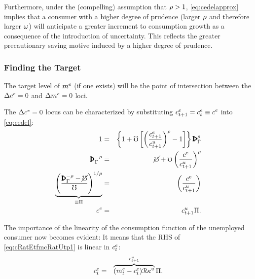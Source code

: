 \message{ !name(TractableBufferStock.tex)}\documentclass{handout}
\begin{document}
Furthermore, under the (compelling) assumption that $\rho > 1$, \eqref{eq:cedelapprox} implies that a consumer with
a higher degree of prudence (larger $\rho$ and therefore larger $\omega$) will
anticipate a greater increment to consumption growth as a consequence of the introduction of uncertainty.  This reflects the greater precautionary
saving motive induced by a higher degree of prudence.



\subsubsection{Finding the Target}

The target level of $m^{e}$ (if one exists) will be the point of intersection between the $\Delta c^{e}=0$ and $\Delta m^{e}=0$ loci.  

The $\Delta c^{e}=0$ locus can be characterized by substituting $c^{e}_{t+1}=c^{e}_{t} \equiv c^{e}$ into \eqref{eq:cedel}:
\begin{eqnarray}
         1 & = & \left\{1+\urate\left[\left(\frac{\cRatE_{t+1}}{\cRat_{t+1}^{u}}\right)^{\CRRA}-1\right]\right\} \PatPGro^{\CRRA} \label{eq:ctp1OctEq1}
\\ \PatPGro^{-\CRRA} & = &  \erate+\urate\left(\frac{\cRatE_{\tSS}}{\cRat_{t+1}^{u} }\right)^{\CRRA}
\\ \underbrace{\left(\frac{\PatPGro^{-\CRRA}-\erate}{\urate}\right)^{1/\CRRA}}_{\equiv \straight} & = &   \left(\frac{\cRatE_{\tSS}}{\cRatU_{t+1}}\right) \label{eq:straightDef}
\\      \cRatE_{\tSS} & = & \cRat^{u}_{t+1} \straight \label{eq:cRatEtfmcRatUtp1}.
\end{eqnarray}


The importance of the linearity of the consumption function of the unemployed consumer now becomes evident:  It means that the RHS of \eqref{eq:cRatEtfmcRatUtp1} is linear in $c^{e}_{t}$:
\begin{eqnarray}
  c^{e}_{t} & = & \overbrace{(m^{e}_{t}-c^{e}_{t})\mathcal{R} \kappa^{u}}^{c^{u}_{t+1}} \Pi \label{eq:PSTerm}.
\end{eqnarray}
\end{document}
